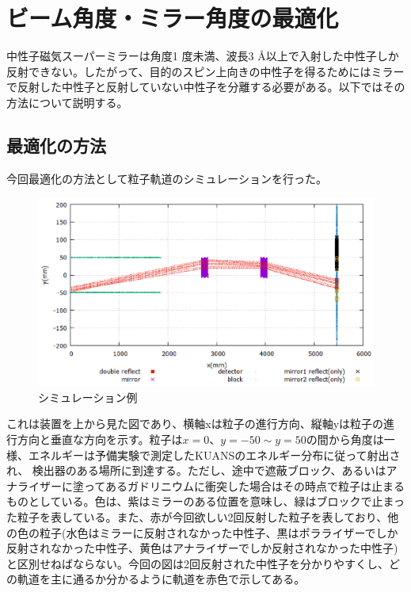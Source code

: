 \section{ビーム角度・ミラー角度の最適化}

中性子磁気スーパーミラーは角度1 度未満、波長3  Å以上で入射した中性子しか反射できない。したがって、目的のスピン上向きの中性子を得るためにはミラーで反射した中性子と反射していない中性子を分離する必要がある。以下ではその方法について説明する。

\subsection{最適化の方法}

今回最適化の方法として粒子軌道のシミュレーションを行った。

\begin{figure}[h]
\centering
\includegraphics[keepaspectratio,scale=0.4]{angle/simulation.png}
\caption{シミュレーション例}
\end{figure}

これは装置を上から見た図であり、横軸xは粒子の進行方向、縦軸yは粒子の進行方向と垂直な方向を示す。粒子は$x=0$、$y=-50 \sim y=50$の間から角度は一様、エネルギーは予備実験で測定したKUANSのエネルギー分布に従って射出され、 検出器のある場所に到達する。ただし、途中で遮蔽ブロック、あるいはアナライザーに塗ってあるガドリニウムに衝突した場合はその時点で粒子は止まるものとしている。色は、紫はミラーのある位置を意味し、緑はブロックで止まった粒子を表している。また、赤が今回欲しい2回反射した粒子を表しており、他の色の粒子(水色はミラーに反射されなかった中性子、黒はポラライザーでしか反射されなかった中性子、黄色はアナライザーでしか反射されなかった中性子)と区別せねばならない。今回の図は2回反射された中性子を分かりやすくし、どの軌道を主に通るか分かるように軌道を赤色で示してある。

